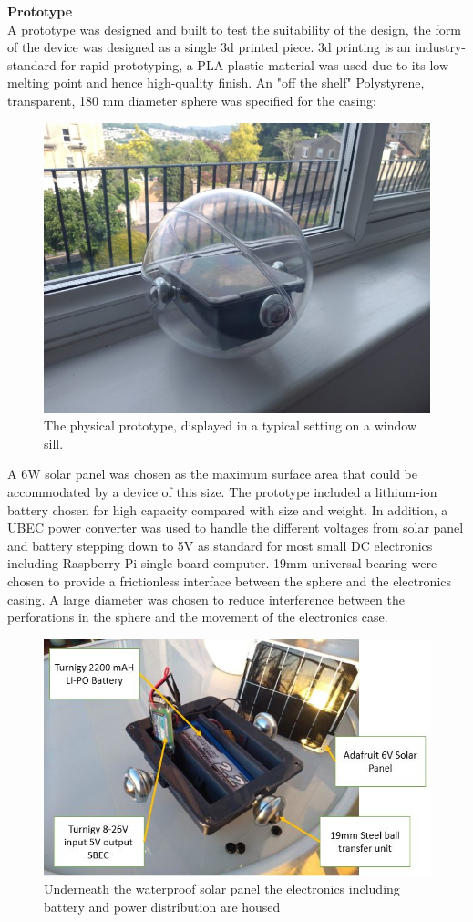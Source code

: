 

\textbf{Prototype}\\

A prototype was designed and built to test the suitability of the design, the form of the device was designed as a single 3d printed piece. 3d printing is an industry-standard for rapid prototyping, a PLA plastic material was used due to its low melting point and hence high-quality finish. An "off the shelf" Polystyrene, transparent, 180 mm diameter sphere was specified for the casing:
\begin{figure}[H]
\centering
\includegraphics[width=0.5\linewidth]{Engineering_hardware/Engineering_hardware_Figures/airm1.JPG}
\caption{The physical prototype, displayed in a typical setting on a window sill.}
\label{fig:15cm_shell_loading}
\end{figure}

A 6W solar panel was chosen as the maximum surface area that could be accommodated by a device of this size. The prototype included a lithium-ion battery chosen for high capacity compared with size and weight. In addition, a UBEC power converter was used to handle the different voltages from solar panel and battery stepping down to 5V as standard for most small DC electronics including Raspberry Pi single-board computer. 19mm universal bearing were chosen to provide a frictionless interface between the sphere and the electronics casing. A large diameter was chosen to reduce interference between the perforations in the sphere and the movement of the electronics case.

\begin{figure}[H]
\centering
\includegraphics[width=0.5\linewidth]{Engineering_hardware/Engineering_hardware_Figures/prototype_pic_1.JPG}
\caption{Underneath the waterproof solar panel the electronics including battery and power distribution are housed }
\label{fig:15cm_shell_loading}
\end{figure}

